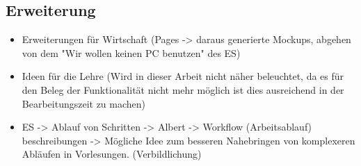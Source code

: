 


\subsection{Erweiterung}\label{subsec:erweiterung}
\begin{itemize}
    \item Erweiterungen für Wirtschaft (Pages -> daraus generierte Mockups, abgehen von dem "Wir wollen keinen PC benutzen" des ES)
    \item Ideen für die Lehre (Wird in dieser Arbeit nicht näher beleuchtet, da es für den Beleg der Funktionalität nicht mehr möglich ist dies ausreichend in der Bearbeitungszeit zu machen)
    \item ES -> Ablauf von Schritten -> Albert -> Workflow (Arbeitsablauf) beschreibungen -> Mögliche Idee zum besseren Nahebringen von komplexeren Abläufen in Vorlesungen. (Verbildlichung)
\end{itemize}
